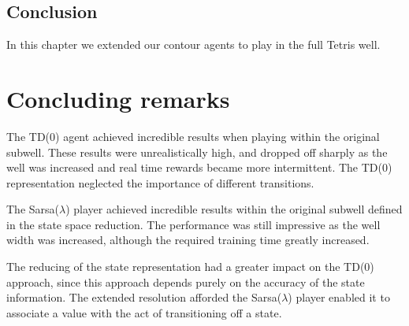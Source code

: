 \documentclass{rucsthesis}
\begin{document}
\section{Conclusion}

In this chapter we extended our contour agents to play in the full Tetris well.

\chapter{Concluding remarks}

The TD(0) agent achieved incredible results when playing within the original subwell. These results were unrealistically high, and dropped off sharply as the well was increased and real time rewards became more intermittent. The TD(0) representation neglected the importance of different transitions.

The Sarsa($\lambda$) player achieved incredible results within the original subwell defined in the state space reduction. The performance was still impressive as the well width was increased, although the required training time greatly increased.

The reducing of the state representation had a greater impact on the TD(0) approach, since this approach depends purely on the accuracy of the state information. The extended resolution afforded the Sarsa($\lambda$) player enabled it to associate a value with the act of transitioning off a state. 


\end{document}
